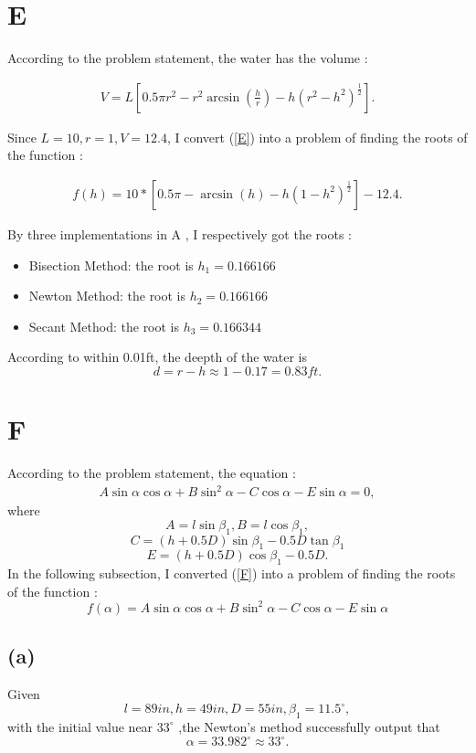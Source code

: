 \documentclass[a4paper]{article}
\begin{document}
\section{E}
According to the problem statement, the water has the volume :

\begin{align}\label{E}
V=L[0.5\pi r^2-r^2\arcsin(\frac{h}{r})-h(r^2-h^2)^{\frac{1}{2}}].
\end{align}

Since \( L = 10, r = 1, V = 12.4\), I convert (\ref{E}) into a problem of finding the roots of the function :

\begin{align}
  f(h)=10*[0.5\pi-\arcsin(h)-h(1-h^2)^{\frac{1}{2}}]-12.4.
\end{align}

By three implementations in A , I respectively got the roots :

\begin{itemize}  
  \item Bisection Method: the root is $h_1 = 0.166166$  
  \item Newton Method: the root is $h_2 = 0.166166$  
  \item Secant Method: the root is $h_3 = 0.166344$  
\end{itemize}  
According to within 0.01ft, the deepth of the water is
$$d = r - h \approx 1 - 0.17 = 0.83ft.$$

\section{F}
According to the problem statement, the equation :
\begin{align}\label{F}
  A\sin\alpha \cos\alpha +B\sin^2 \alpha-C\cos \alpha -E\sin\alpha = 0,
\end{align}
where
$$A = l\sin\beta_1, B = l\cos\beta_1,$$
$$C = (h+0.5D)\sin\beta_1 - 0.5D\tan \beta_1$$
$$E = (h+0.5D)\cos\beta_1-0.5D.$$
In the following subsection, I converted (\ref{F}) into a problem of finding the roots of the function :
$$f(\alpha) = A\sin\alpha \cos\alpha +B\sin^2 \alpha-C\cos \alpha -E\sin\alpha$$
\subsection*{(a)}
Given $$ l = 89 in, h = 49 in, D = 55 in, \beta_1 = 11.5^{\circ},$$ with the initial value near $33^{\circ}$ ,the Newton's method successfully output that 
$$\alpha = 33.982^{\circ} \approx 33^{\circ}.$$
\end{document}

